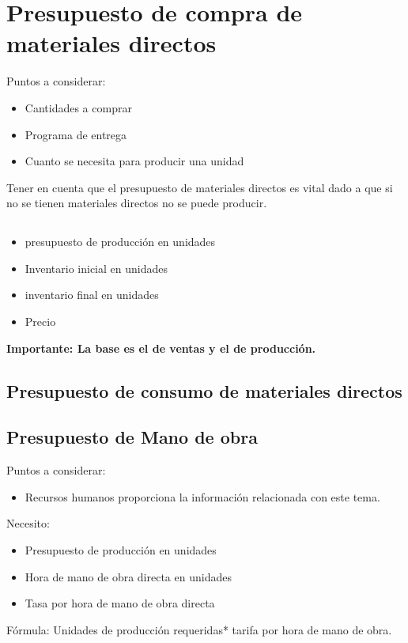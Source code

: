 \section{Presupuesto de compra de materiales directos}
Puntos a considerar:
\begin{itemize}
    \item Cantidades a comprar 
    \item Programa de entrega
    \item Cuanto se necesita para producir una unidad 
\end{itemize}

Tener en cuenta que el presupuesto de materiales directos es vital dado a que si no se tienen materiales directos no se puede producir.


\subsection{ }
\begin{itemize}
    \item presupuesto de producción en unidades 
    \item Inventario inicial en unidades 
    \item inventario final en unidades 
    \item Precio 
\end{itemize}

\textbf{Importante: La base es el de ventas y el de producción.}


\subsection{Presupuesto de consumo de materiales directos}

\subsection{Presupuesto de Mano de obra}
Puntos a considerar:
\begin{itemize}
    \item Recursos humanos proporciona la información relacionada con este tema.
\end{itemize}
Necesito:
\begin{itemize}
    \item Presupuesto de producción en unidades 
    \item Hora de mano de obra directa en unidades 
    \item Tasa por hora de mano de obra directa 
\end{itemize}
Fórmula: Unidades de producción requeridas* tarifa por hora de mano de obra.
